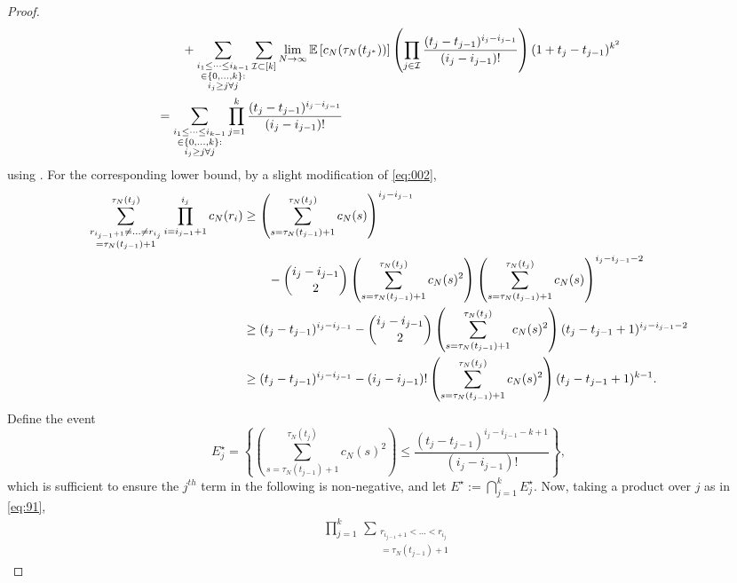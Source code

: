 \documentclass{article}
\newcommand{\E}{\mathbb{E}}
\newcommand{\1}[1]{\mathbbm{1}_{#1}}
\begin{document}
\begin{proof}
\begin{align}
    &\qquad+ \sum_{\substack{i_1\leq \dots\leq i_{k-1}\\ \in \{0,\dots,k\} 
        :\\ i_j \geq j \forall j}} \sum_{\mathcal{I} \subset [k]} \lim_{N\to\infty} 
        \E \left[ c_N(\tau_N(t_{j^*})) \right] 
        \left( \prod_{j\in\mathcal{I}} \frac{(t_j - t_{j-1})^{i_j - i_{j-1}}}
        {(i_j - i_{j-1})!}\right) (1+ t_j - t_{j-1})^{k^2} \notag\\
&= \sum_{\substack{i_1\leq \dots\leq i_{k-1}\\ \in \{0,\dots,k\} :\\ 
        i_j \geq j \forall j}} \prod_{j=1}^k \frac{(t_j - t_{j-1})^{i_j - i_{j-1}}}
        {(i_j - i_{j-1})!}
\end{align}
using \citet[Equation (3.3)]{brown2021}.
For the corresponding lower bound,
by a slight modification of \eqref{eq:002},
\begin{align}
\sum_{\substack{ r_{i_{j-1}+1} \neq \dots \neq r_{i_j} 
        \\ = \tau_N(t_{j-1})+1 }}^{\tau_N(t_j)}
        \prod_{i=i_{j-1}+1}^{i_j} c_N(r_i)
&\geq \left( \sum_{s=\tau_N(t_{j-1})+1}^{\tau_N(t_j)} c_N(s) \right)
        ^{i_j - i_{j-1}} \notag\\
    &\qquad- \binom{i_j - i_{j-1}}{2} \left( \sum_{s=\tau_N(t_{j-1})+1}
        ^{\tau_N(t_j)} c_N(s)^2 \right)
        \left( \sum_{s=\tau_N(t_{j-1})+1}^{\tau_N(t_j)} c_N(s) \right)
        ^{i_j - i_{j-1} -2} \notag\\
&\geq (t_j - t_{j-1})^{i_j - i_{j-1}}
        - \binom{i_j - i_{j-1}}{2} \left( \sum_{s=\tau_N(t_{j-1})+1}^{\tau_N(t_j)}        
        c_N(s)^2 \right) ( t_j - t_{j-1} +1 )^{i_j - i_{j-1} -2} \notag\\
&\geq (t_j - t_{j-1})^{i_j - i_{j-1}}
        - (i_j - i_{j-1})! \left( \sum_{s=\tau_N(t_{j-1})+1}^{\tau_N(t_j)}
        c_N(s)^2 \right) ( t_j - t_{j-1} +1 )^{k-1} .
\end{align}
Define the event
\begin{equation}
E_j^\star
= \left\{ \left( \sum_{s=\tau_N(t_{j-1})+1}^{\tau_N(t_j)} c_N(s)^2 \right)
        \leq \frac{ (t_j - t_{j-1})^{i_j - i_{j-1} -k +1} }{ (i_j - i_{j-1})! } \right\} ,
\end{equation}
which is sufficient to ensure the $j^{th}$ term in the following is non-negative,
and let 
$E^\star := \bigcap_{j=1}^k E_j^\star$.
Now, taking a product over $j$ as in \eqref{eq:91}, 
\begin{align}
\prod_{j=1}^k \,
        \sum_{\substack{ r_{i_{j-1}+1} < \dots < r_{i_j} \\ = \tau_N(t_{j-1})+1}}

\end{align}
\end{proof}
\end{document}
